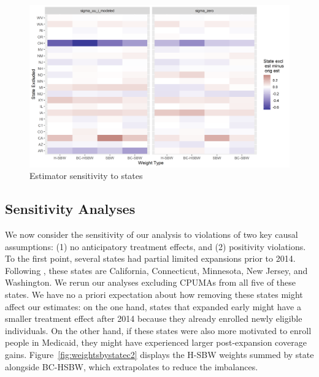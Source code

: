 \documentclass[aoas]{imsart}
\theoremstyle{plain}
\theoremstyle{remark}
\begin{document}
\begin{figure}[H]
\begin{center}
    \caption{Estimator sensitivity to states}
    \label{fig:loostateplot}
    \includegraphics[scale=0.6]{01_Plots/loostate-sensitivityc1-state-uu-i.png}
\end{center}
\end{figure}

\subsection{Sensitivity Analyses} \label{sssec:sensitivity}

We now consider the sensitivity of our analysis to violations of two key causal assumptions: (1) no anticipatory treatment effects, and (2) positivity violations. To the first point, several states had partial limited expansions prior to 2014. Following \cite{frean2017premium}, these states are California, Connecticut, Minnesota, New Jersey, and Washington. We rerun our analyses excluding CPUMAs from all five of these states. We have no a priori expectation about how removing these states might affect our estimates: on the one hand, states that expanded early might have a smaller treatment effect after 2014 because they already enrolled newly eligible individuals. On the other hand, if these states were also more motivated to enroll people in Medicaid, they might have experienced larger post-expansion coverage gains. Figure~\ref{fig:weightsbystatec2} displays the H-SBW weights summed by state alongside BC-HSBW, which extrapolates to reduce the imbalances. 
\end{document}
